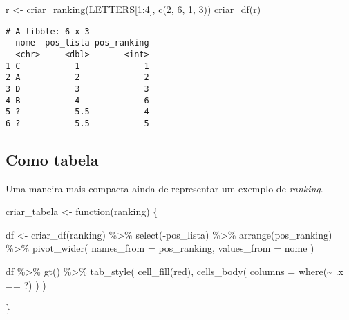 \documentclass[
  letterpaper,
  DIV=11,
  numbers=noendperiod]{scrreprt}
\newenvironment{Shaded}{\begin{snugshade}}{\end{snugshade}}
\newcommand{\AttributeTok}[1]{\textcolor[rgb]{0.40,0.45,0.13}{#1}}
\newcommand{\ControlFlowTok}[1]{\textcolor[rgb]{0.00,0.23,0.31}{#1}}
\newcommand{\DecValTok}[1]{\textcolor[rgb]{0.68,0.00,0.00}{#1}}
\newcommand{\FunctionTok}[1]{\textcolor[rgb]{0.28,0.35,0.67}{#1}}
\newcommand{\NormalTok}[1]{\textcolor[rgb]{0.00,0.23,0.31}{#1}}
\newcommand{\OtherTok}[1]{\textcolor[rgb]{0.00,0.23,0.31}{#1}}
\newcommand{\SpecialCharTok}[1]{\textcolor[rgb]{0.37,0.37,0.37}{#1}}
\newcommand{\StringTok}[1]{\textcolor[rgb]{0.13,0.47,0.30}{#1}}
\begin{document}
\begin{Shaded}
\begin{Highlighting}[]
\NormalTok{r }\OtherTok{\textless{}{-}} \FunctionTok{criar\_ranking}\NormalTok{(LETTERS[}\DecValTok{1}\SpecialCharTok{:}\DecValTok{4}\NormalTok{], }\FunctionTok{c}\NormalTok{(}\DecValTok{2}\NormalTok{, }\DecValTok{6}\NormalTok{, }\DecValTok{1}\NormalTok{, }\DecValTok{3}\NormalTok{))}
\FunctionTok{criar\_df}\NormalTok{(r)}
\end{Highlighting}
\end{Shaded}

\begin{verbatim}
# A tibble: 6 x 3
  nome  pos_lista pos_ranking
  <chr>     <dbl>       <int>
1 C           1             1
2 A           2             2
3 D           3             3
4 B           4             6
5 ?           5.5           4
6 ?           5.5           5
\end{verbatim}

\subsection{Como tabela}\label{como-tabela}

Uma maneira mais compacta ainda de representar um exemplo de
\emph{ranking}.

\begin{Shaded}
\begin{Highlighting}[]
\NormalTok{criar\_tabela }\OtherTok{\textless{}{-}} \ControlFlowTok{function}\NormalTok{(ranking) \{}
  
\NormalTok{  df }\OtherTok{\textless{}{-}} \FunctionTok{criar\_df}\NormalTok{(ranking) }\SpecialCharTok{\%\textgreater{}\%}
    \FunctionTok{select}\NormalTok{(}\SpecialCharTok{{-}}\NormalTok{pos\_lista) }\SpecialCharTok{\%\textgreater{}\%} 
    \FunctionTok{arrange}\NormalTok{(pos\_ranking) }\SpecialCharTok{\%\textgreater{}\%} 
    \FunctionTok{pivot\_wider}\NormalTok{(}
      \AttributeTok{names\_from =}\NormalTok{ pos\_ranking,}
      \AttributeTok{values\_from =}\NormalTok{ nome}
\NormalTok{    )}

\NormalTok{  df }\SpecialCharTok{\%\textgreater{}\%}
    \FunctionTok{gt}\NormalTok{() }\SpecialCharTok{\%\textgreater{}\%} 
      \FunctionTok{tab\_style}\NormalTok{(}
        \FunctionTok{cell\_fill}\NormalTok{(}\StringTok{\textquotesingle{}red\textquotesingle{}}\NormalTok{),}
        \FunctionTok{cells\_body}\NormalTok{(}
          \AttributeTok{columns =} \FunctionTok{where}\NormalTok{(}\SpecialCharTok{\textasciitilde{}}\NormalTok{ .x }\SpecialCharTok{==} \StringTok{\textquotesingle{}?\textquotesingle{}}\NormalTok{)}
\NormalTok{        )}
\NormalTok{      )}
  
\NormalTok{\}}
\end{Highlighting}
\end{Shaded}
\end{document}
